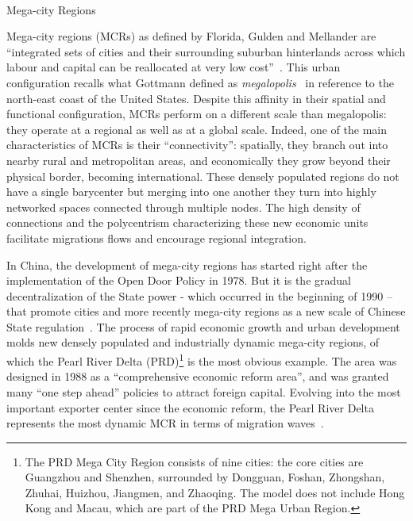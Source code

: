 \paragraph{}{Mega-city Regions}

Mega-city regions (MCRs) as defined by Florida, Gulden and Mellander are ``integrated sets of cities and their surrounding suburban hinterlands across which labour and capital can be reallocated at very low cost''~\cite{florida2008rise}. This urban configuration recalls what Gottmann defined as \emph{megalopolis}~\cite{gottman1961megalopolis} in reference to the north-east coast of the United States. Despite this affinity in their spatial and functional configuration, MCRs perform on a different scale than megalopolis: they operate at a regional as well as at a global scale. Indeed, one of the main characteristics of MCRs is their “connectivity”: spatially, they branch out into nearby rural and metropolitan areas, and economically they grow beyond their physical border, becoming international. These densely populated regions do not have a single barycenter but merging into one another they turn into highly networked spaces connected through multiple nodes. The high density of connections and the polycentrism characterizing these new economic units facilitate migrations flows and encourage regional integration.

In China, the development of mega-city regions has started right after the implementation of the Open Door Policy in 1978. But it is the gradual decentralization of the State power - which occurred in the beginning of 1990 – that promote cities and more recently mega-city regions as a new scale of Chinese State regulation~\cite{IJUR:IJUR12437}. The process of rapid economic growth and urban development molds new densely populated and industrially dynamic mega-city regions, of which the Pearl River Delta (PRD)\footnote{The PRD Mega City Region consists of nine cities: the core cities are Guangzhou and Shenzhen, surrounded by Dongguan, Foshan, Zhongshan, Zhuhai, Huizhou, Jiangmen, and Zhaoqing. The model does not include Hong Kong and Macau, which are part of the PRD Mega Urban Region.} is the most obvious example. The area was designed in 1988 as a ``comprehensive economic reform area'', and was granted many ``one step ahead'' policies to attract foreign capital. Evolving into the most important exporter center since the economic reform, the Pearl River Delta represents the most dynamic MCR in terms of migration waves~\cite{IJUR:IJUR820}.

